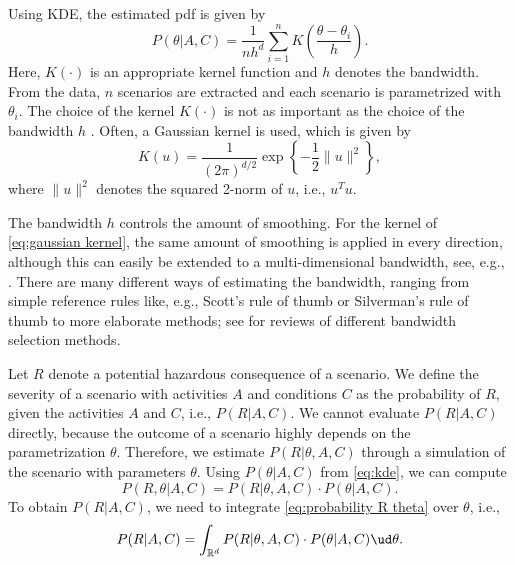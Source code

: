 Using KDE, the estimated pdf is given by
\begin{equation}
	\label{eq:kde}
	P(\theta|A,C) = \frac{1}{nh^d} \sum_{i=1}^n K\left(\frac{\theta - \theta_i}{h}\right).
\end{equation}
Here, $K(\cdot)$ is an appropriate kernel function and $h$ denotes the bandwidth. From the data, $n$ scenarios are extracted and each scenario is parametrized with $\theta_i$. The choice of the kernel $K(\cdot)$ is not as important as the choice of the bandwidth $h$ \cite{turlach1993bandwidthselection}. Often, a Gaussian kernel is used, which is given by
\begin{equation}
	\label{eq:gaussian kernel}
	K(u) = \frac{1}{\left( 2\pi \right)^{d/2}} \exp \left\{ -\frac{1}{2} \|u\|^2 \right\},
\end{equation}
where $\|u\|^2$ denotes the squared 2-norm of $u$, i.e., $u^T u$.

The bandwidth $h$ controls the amount of smoothing. For the kernel of \cref{eq:gaussian kernel}, the same amount of smoothing is applied in every direction, although this can easily be extended to a multi-dimensional bandwidth, see, e.g., \cite{scott2005multidimensional, chen2017tutorial}. There are many different ways of estimating the bandwidth, ranging from simple reference rules like, e.g., Scott's rule of thumb \cite{scott2015multivariate} or Silverman's rule of thumb \cite{silverman1986density} to more elaborate methods; see \cite{turlach1993bandwidthselection, bashtannyk2001bandwidth, jones1996brief, chiu1996comparative} for reviews of different bandwidth selection methods. 

Let $R$ denote a potential hazardous consequence of a scenario. We define the severity of a scenario with activities $A$ and conditions $C$ as the probability of $R$, given the activities $A$ and $C$, i.e., $P(R|A,C)$. We cannot evaluate $P(R|A,C)$ directly, because the outcome of a scenario highly depends on the parametrization $\theta$. Therefore, we estimate $P(R|\theta,A,C)$ through a simulation of the scenario with parameters $\theta$. Using $P(\theta|A,C)$ from \cref{eq:kde}, we can compute 
\begin{equation} \label{eq:probability R theta}
	P(R,\theta|A,C) = P(R|\theta,A,C) \cdot P(\theta|A,C).
\end{equation}
To obtain $P(R|A,C)$, we need to integrate \cref{eq:probability R theta} over $\theta$, i.e., 
\begin{equation} \label{eq:probability R}
	P(R|A,C) = \int_{\mathbb{R}^d} P(R|\theta,A,C) \cdot P(\theta|A,C) \ud \theta.
\end{equation}

